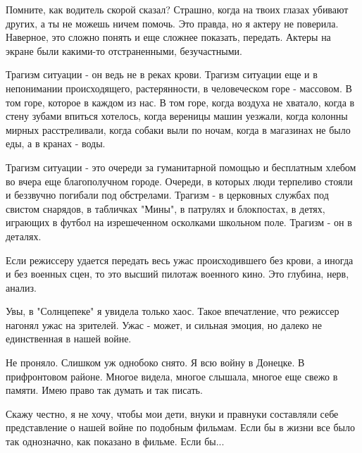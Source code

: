 Помните, как водитель скорой сказал? Страшно, когда на твоих глазах убивают
других, а ты не можешь ничем помочь.  Это правда, но я актеру не поверила.
Наверное, это сложно понять и еще сложнее показать, передать. Актеры на экране
были какими-то отстраненными, безучастными.

Трагизм ситуации - он ведь не в реках крови. Трагизм ситуации еще и в
непонимании происходящего, растерянности, в человеческом горе - массовом. В том
горе, которое в каждом из нас. В том горе, когда воздуха не хватало, когда в
стену зубами впиться хотелось, когда вереницы машин уезжали, когда колонны
мирных расстреливали, когда собаки выли по ночам, когда в магазинах не было
еды, а в кранах - воды. 

Трагизм ситуации - это очереди за гуманитарной помощью и бесплатным хлебом во
вчера еще благополучном городе. Очереди, в которых люди  терпеливо стояли и
беззвучно погибали под обстрелами.  Трагизм - в церковных службах под свистом
снарядов, в табличках "Мины", в патрулях и блокпостах, в детях, играющих в
футбол на изрешеченном осколками школьном поле. Трагизм - он в деталях.  

Если режиссеру удается передать весь ужас происходившего без крови, а иногда и
без военных сцен, то это высший пилотаж военного кино. Это глубина, нерв,
анализ.

Увы, в "Солнцепеке" я увидела только хаос. Такое впечатление, что режиссер
нагонял ужас на зрителей. Ужас - может, и сильная эмоция, но далеко не
единственная в нашей войне.

Не проняло. Слишком уж однобоко снято. Я всю войну в Донецке. В прифронтовом
районе. Многое видела, многое слышала, многое еще свежо в памяти. Имею право
так думать и так писать.

Скажу честно, я не хочу, чтобы мои дети, внуки и правнуки составляли себе
представление о нашей войне по подобным фильмам. Если бы в жизни все было так
однозначно, как показано в фильме. Если бы...
